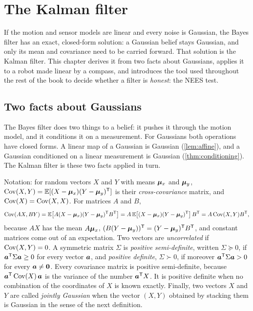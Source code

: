 \chapter{The Kalman filter}
\label{ch:kalman}

If the motion and sensor models are linear and every noise is Gaussian,
the Bayes filter has an exact, closed-form solution: a Gaussian belief
stays Gaussian, and only its mean and covariance need to be carried
forward. That solution is the Kalman filter. This chapter derives it from
two facts about Gaussians, applies it to a robot made linear by a compass,
and introduces the tool used throughout the rest of the book to decide
whether a filter is \emph{honest}: the NEES test.

\section{Two facts about Gaussians}

The Bayes filter does two things to a belief: it pushes it through the
motion model, and it conditions it on a measurement. For Gaussians both
operations have closed forms. A linear map of a Gaussian is Gaussian
(\cref{lem:affine}), and a Gaussian conditioned on a linear measurement is
Gaussian (\cref{thm:conditioning}). The Kalman filter is these two facts
applied in turn.

Notation: for random vectors $X$ and $Y$ with means $\bm{\mu}_x$ and $\bm{\mu}_y$,
$\operatorname{Cov}(X,Y)=\mathbb{E}[(X-\bm{\mu}_x)(Y-\bm{\mu}_y)^{\mathsf{T}}]$ is their \emph{cross-covariance}
matrix, and $\operatorname{Cov}(X)=\operatorname{Cov}(X,X)$. For matrices $A$ and $B$,
\[
  \operatorname{Cov}(AX,BY)=\mathbb{E}\bigl[A(X-\bm{\mu}_x)(Y-\bm{\mu}_y)^{\mathsf{T}} B^{\mathsf{T}}\bigr]
  =A\,\mathbb{E}\bigl[(X-\bm{\mu}_x)(Y-\bm{\mu}_y)^{\mathsf{T}}\bigr]\,B^{\mathsf{T}}=A\operatorname{Cov}(X,Y)B^{\mathsf{T}},
\]
because $AX$ has the mean $A\bm{\mu}_x$, $(B(Y-\bm{\mu}_y))^{\mathsf{T}}=(Y-\bm{\mu}_y)^{\mathsf{T}} B^{\mathsf{T}}$,
and constant matrices come out of an expectation. Two vectors are \emph{uncorrelated} if
$\operatorname{Cov}(X,Y)=0$. A symmetric matrix $\Sigma$ is \emph{positive
semi-definite}, written $\Sigma\succeq0$, if
$\bm{a}^{\mathsf{T}}\Sigma\bm{a}\ge0$ for every vector $\bm{a}$, and
\emph{positive definite}, $\Sigma\succ0$, if moreover
$\bm{a}^{\mathsf{T}}\Sigma\bm{a}>0$ for every $\bm{a}\neq\bm{0}$. Every covariance
matrix is positive semi-definite, because $\bm{a}^{\mathsf{T}}\operatorname{Cov}(X)\,\bm{a}$ is
the variance of the number $\bm{a}^{\mathsf{T}} X$. It is positive definite when no
combination of the coordinates of $X$ is known exactly. Finally, two
vectors $X$ and $Y$ are called \emph{jointly Gaussian} when the vector
$(X,Y)$ obtained by stacking them is Gaussian in the sense of the next
definition.

